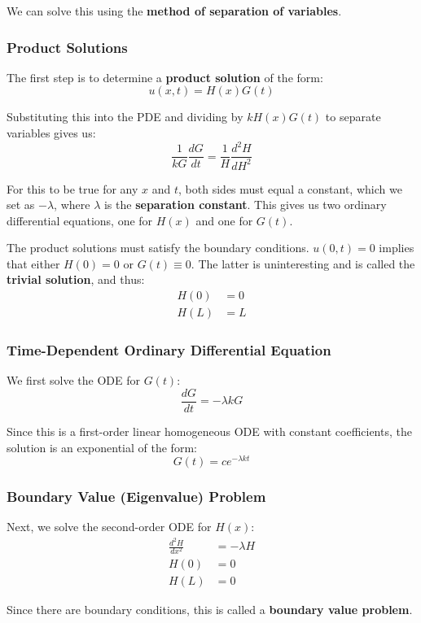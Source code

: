 \documentclass{article}
\begin{document}
We can solve this using the \textbf{method of separation of variables}. 

\subsubsection{Product Solutions}

The first step is to determine a \textbf{product solution} of the form:
\[
    u(x,t)=H(x)G(t)
\]


Substituting this into the PDE and dividing by \(kH(x)G(t)\) to separate variables gives us:
\[
    \frac{1}{kG}\frac{dG}{dt}=\frac{1}{H}\frac{d^2H}{dH^2}
\]

For this to be true for any \(x\) and \(t\), both sides must equal a constant, which we set as \(-\lambda \), where \(\lambda \) is the 
\textbf{separation constant}. This gives us two ordinary differential equations, one for \(H(x)\) and one for \(G(t)\).

The product solutions must satisfy the boundary conditions. \(u(0,t)=0\) implies that either \(H(0)=0\) or \(G(t)\equiv 0\). The latter is 
uninteresting and is called the \textbf{trivial solution}, and thus:
\begin{align*}
    H(0)&=0 \\
    H(L)&=L
\end{align*}   

\subsubsection{Time-Dependent Ordinary Differential Equation}

We first solve the ODE for \(G(t)\):
\[
    \frac{dG}{dt}=-\lambda kG
\] 

Since this is a first-order linear homogeneous ODE with constant coefficients, the solution is an exponential of the form:
\[
    G(t)=ce^{-\lambda  kt}
\]

\subsubsection{Boundary Value (Eigenvalue) Problem}

Next, we solve the second-order ODE for \(H(x)\):
\begin{align*}
    \frac{d^2 H}{dx^2}&=-\lambda H \\
    H(0)&=0 \\
    H(L)&=0 
\end{align*} 

Since there are boundary conditions, this is called a \textbf{boundary value problem}.
\end{document}
